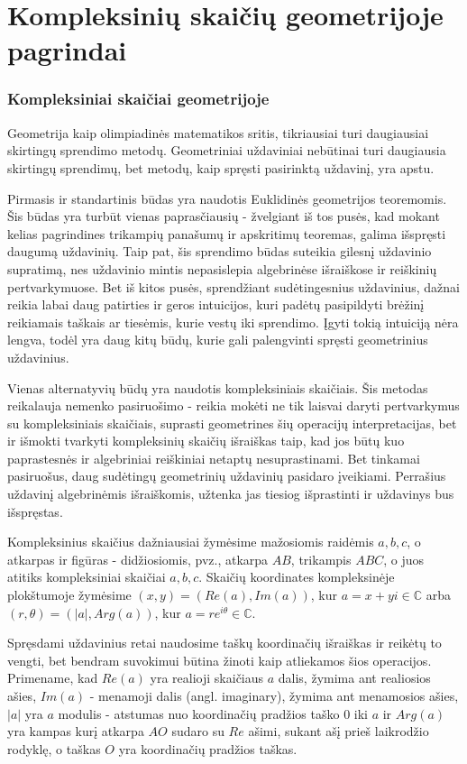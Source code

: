 \documentclass[11pt,a4paper,twoside]{book}
\theoremstyle{definition} \newtheorem*{api}{Apibrėžimas}
\theoremstyle{remark} \newtheorem*{pastaba}{Pastaba}
\begin{document}
\chapter {Kompleksinių skaičių geometrijoje pagrindai}

\subsection*{Kompleksiniai skaičiai geometrijoje}

Geometrija kaip olimpiadinės matematikos sritis, tikriausiai turi daugiausiai skirtingų sprendimo metodų. Geometriniai uždaviniai nebūtinai turi daugiausia skirtingų sprendimų, bet metodų, kaip spręsti pasirinktą uždavinį, yra apstu. 

Pirmasis ir standartinis būdas yra naudotis Euklidinės geometrijos teoremomis. Šis būdas yra turbūt vienas paprasčiausių - žvelgiant iš tos pusės, kad mokant kelias pagrindines trikampių panašumų ir apskritimų teoremas, galima išspręsti daugumą uždavinių. Taip pat, šis sprendimo būdas suteikia gilesnį uždavinio supratimą, nes uždavinio mintis nepasislepia algebrinėse išraiškose ir reiškinių pertvarkymuose. Bet iš kitos pusės, sprendžiant sudėtingesnius uždavinius, dažnai reikia labai daug patirties ir geros intuicijos, kuri padėtų pasipildyti brėžinį reikiamais taškais ar tiesėmis, kurie vestų iki sprendimo. Įgyti tokią intuiciją nėra lengva, todėl yra daug kitų būdų, kurie gali palengvinti spręsti geometrinius uždavinius.

Vienas alternatyvių būdų yra naudotis kompleksiniais skaičiais. Šis metodas reikalauja nemenko pasiruošimo - reikia mokėti ne tik laisvai daryti pertvarkymus su kompleksiniais skaičiais, suprasti geometrines šių operacijų interpretacijas, bet ir išmokti tvarkyti kompleksinių skaičių išraiškas taip, kad jos būtų kuo paprastesnės ir algebriniai reiškiniai netaptų nesuprastinami. Bet tinkamai pasiruošus, daug sudėtingų geometrinių uždavinių pasidaro įveikiami. Perrašius uždavinį algebrinėmis išraiškomis, užtenka jas tiesiog išprastinti ir uždavinys bus išspręstas. 

Kompleksinius skaičius dažniausiai žymėsime mažosiomis raidėmis $a, b, c$, o atkarpas ir figūras - didžiosiomis, pvz., atkarpa $AB$, trikampis $ABC$, o juos atitiks kompleksiniai skaičiai $a, b, c$. Skaičių koordinates kompleksinėje plokštumoje žymėsime $(x, y)=(Re (a), Im (a))$, kur $a = x + yi \in \mathbb{C}$ arba  $(r, \theta)=(|a|, Arg(a))$, kur $a = re^{i\theta} \in \mathbb{C}$. 

Spręsdami uždavinius retai naudosime taškų koordinačių išraiškas ir reikėtų to vengti, bet bendram suvokimui būtina žinoti kaip atliekamos šios operacijos. Primename, kad $Re (a)$ yra realioji skaičiaus $a$ dalis, žymima ant realiosios ašies, $Im (a)$ - menamoji dalis (angl. imaginary), žymima ant menamosios ašies, $|a|$ yra $a$ modulis - atstumas nuo koordinačių pradžios taško $0$ iki $a$ ir $Arg (a)$ yra kampas kurį atkarpa $AO$ sudaro su $Re$ ašimi, sukant ašį prieš laikrodžio rodyklę, o taškas $O$ yra koordinačių pradžios taškas.
\end{document}

